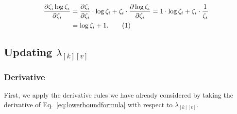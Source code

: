 \documentclass[12pt]{article}
\newcommand\numberthis{\addtocounter{equation}{1}\tag{\theequation}}
\begin{document}
\begin{align*}
    \frac{\partial \zeta_{i} \log \zeta_{i}}{\partial \zeta_{i}}
    &=
    \frac{\partial \zeta_{i}}{\partial \zeta_{i}} \cdot \log \zeta_{i} +
    \zeta_{i} \cdot \frac{\partial \log \zeta_{i}}{\partial \zeta_{i}}
    =
    1 \cdot \log \zeta_{i} +
    \zeta_{i} \cdot \frac{1}{\zeta_{i}}
    \\ &= \log \zeta_{i} + 1.
    \numberthis
\end{align*}

\subsection{Updating $\lambda_{[k][v]}$}

\subsubsection{Derivative}

First, we apply the derivative rules we have already considered by taking the
derivative of Eq.~\ref{eq:lowerboundformula} with respect to $\lambda_{[k][v]}$.
\end{document}
